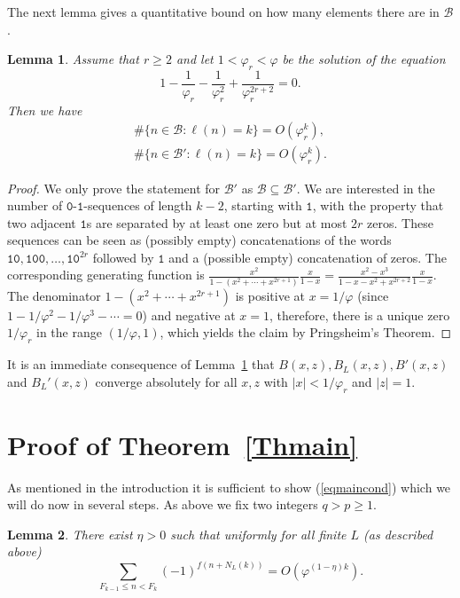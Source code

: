 \documentclass[12pt]{amsart}
\newtheorem{lemma}{Lemma}
\begin{document}
The next lemma gives a quantitative bound on how many elements there are in $\mathcal{B}$.

\begin{lemma}\label{LeB}
Assume that $r\geq 2$ and let $1<\varphi_r< \varphi$ be the solution of the equation
\[
1 - \frac 1{\varphi_r} - \frac 1{\varphi_r^2} + \frac 1{\varphi_r^{2r+2}} = 0.
\]
Then we have
\begin{align*}
\# \{ n \in \mathcal{B}: \ell(n) = k \} = O\left( \varphi_r^k \right),\\
\# \{ n \in \mathcal{B}': \ell(n) = k \} = O{\left( {\varphi_r^k} \right)}.
\end{align*}
\end{lemma}

\begin{proof}
We only prove the statement for $\mathcal{B}'$ as $\mathcal{B} \subseteq \mathcal{B}'$.
We are interested in the number of ${\mathtt{0}}$-${\mathtt{1}}$-sequences of length $k-2$, starting with ${\mathtt{1}}$, with the
property that two adjacent ${\mathtt{1}}$s are separated by at least one zero but at most $2r$ zeros.
These sequences can be seen as (possibly empty) concatenations of the words ${\mathtt{1}}{\mathtt{0}},{\mathtt{1}}{\mathtt{0}}{\mathtt{0}},\ldots,{\mathtt{1}}{\mathtt{0}}^{2r}$ followed by ${\mathtt{1}}$ and a (possible empty) concatenation of zeros.
The corresponding generating function is $\frac {x^2}{1-(x^2+\cdots+x^{2r+1})} \frac{x}{1-x}=\frac{x^2-x^3}{1-x-x^2+x^{2r+2}} \frac{x}{1-x}$.
The denominator $1-(x^2+\cdots+x^{2r+1})$ is positive at $x=1/\varphi$ (since $1-1/\varphi^2-1/\varphi^3-\cdots=0$) and negative at $x=1$, 
therefore, there is a unique zero $1/\varphi_r$ in the range $(1/\varphi,1)$, which yields the claim by Pringsheim's Theorem.
\end{proof}

It is an immediate consequence of Lemma~\ref{LeB} that $B(x,z),B_L(x,z), B'(x,z)$ and $B_L'(x,z)$
converge absolutely for all $x,z$ with $\lvert x\rvert < 1/\varphi_r$ and $\lvert z\rvert = 1$.

\section{Proof of Theorem~\ref{Thmain}}\label{sec4}

As mentioned in the introduction it is sufficient to show (\ref{eqmaincond}) which we
will do now in several steps. As above we fix two integers $q>p \geq 1$.

\begin{lemma}\label{Lesec4.1}
There exist $\eta> 0$ such that uniformly for all finite $L$ (as described above)
\[
\sum_{F_{k-1}\le n < F_k} (-1)^{f(n+N_L(k))} = O\left( \varphi^{(1-\eta) k} \right).
\]
\end{lemma}
\end{document}
